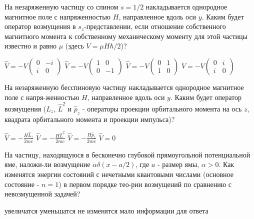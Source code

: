 \documentclass[11pt,a4paper]{exam}
\begin{document}
\begin{questions}
\question На незаряженную частицу со спином $s = 1/2$ накладывается однородное магнитное поле с напряженностью $H$, направленное вдоль оси $y$. Каким будет оператор возмущения в ${s_z}$-представлении, если отношение собственного магнитного момента к собственному механическому моменту для этой частицы известно и равно $\mu $ (здесь $V = \mu H\hbar /2$)?
\begin{choices}
\choice $\hat V =  - V\left( {\begin{array}{*{20}{c}}
0&{ - i}\\
i&0
\end{array}} \right)$   
\choice $\hat V =  - V\left( {\begin{array}{*{20}{c}}
1&0\\
0&{ - 1}
\end{array}} \right)$   
\choice $\hat V =  - V\left( {\begin{array}{*{20}{c}}
0&1\\
1&0
\end{array}} \right)$   
\choice $\hat V =  - V\left( {\begin{array}{*{20}{c}}
0&i\\
i&0
\end{array}} \right)$
\end{choices}

\question На незаряженную бесспиновую частицу накладывается однородное магнитное поле с напря-женностью $H$, направленное вдоль оси $y$. Каким будет оператор возмущения (${\hat L_z}$, ${\hat L^2}$ и ${\hat p_z}$ - операторы проекции орбитального момента на ось $z$, квадрата орбитального момента и проекции импульса)?
\begin{choices}
\choice $\hat V =  - \frac{{H{{\hat L}_z}}}{{2mc}}$     
\choice $\hat V =  - \frac{{H{{\hat L}^2}}}{{2mc}}$     
\choice $\hat V =  - \frac{{H{{\hat p}_z}}}{{2mc}}$     
\choice $\hat V = 0$
\end{choices}

\question На частицу, находящуюся в бесконечно глубокой прямоугольной потенциальной яме, наложи-ли возмущение $\alpha \delta (x - a/2)$, где $a$ - размер ямы, $\alpha  > 0$. Как изменятся энергии состояний с нечетными квантовыми числами (основное состояние - $n = 1$) в первом порядке тео-рии возмущений по сравнению с невозмущенной задачей?
\begin{choices}
\choice увеличатся     
\choice уменьшатся  
\choice не изменятся   
\choice мало информации для ответа
\end{choices}


\end{questions}
\end{document}

